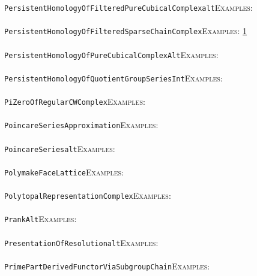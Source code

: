 \documentclass[a4paper,11pt]{report}
\begin{document}
{{ \texttt{PersistentHomologyOfFilteredPureCubicalComplex{\textunderscore}alt}{\nobreakspace}{\nobreakspace}{\nobreakspace}{\nobreakspace}\textsc{Examples:} \\
 \\
 \texttt{PersistentHomologyOfFilteredSparseChainComplex}{\nobreakspace}{\nobreakspace}{\nobreakspace}{\nobreakspace}\textsc{Examples:} \href{../www/SideLinks/About/aboutPersistent.html} {1}{\nobreakspace} \\
 \\
 \texttt{PersistentHomologyOfPureCubicalComplex{\textunderscore}Alt}{\nobreakspace}{\nobreakspace}{\nobreakspace}{\nobreakspace}\textsc{Examples:} \\
 \\
 \texttt{PersistentHomologyOfQuotientGroupSeries{\textunderscore}Int}{\nobreakspace}{\nobreakspace}{\nobreakspace}{\nobreakspace}\textsc{Examples:} \\
 \\
 \texttt{PiZeroOfRegularCWComplex}{\nobreakspace}{\nobreakspace}{\nobreakspace}{\nobreakspace}\textsc{Examples:} \\
 \\
 \texttt{PoincareSeriesApproximation}{\nobreakspace}{\nobreakspace}{\nobreakspace}{\nobreakspace}\textsc{Examples:} \\
 \\
 \texttt{PoincareSeries{\textunderscore}alt}{\nobreakspace}{\nobreakspace}{\nobreakspace}{\nobreakspace}\textsc{Examples:} \\
 \\
 \texttt{PolymakeFaceLattice}{\nobreakspace}{\nobreakspace}{\nobreakspace}{\nobreakspace}\textsc{Examples:} \\
 \\
 \texttt{PolytopalRepresentationComplex}{\nobreakspace}{\nobreakspace}{\nobreakspace}{\nobreakspace}\textsc{Examples:} \\
 \\
 \texttt{PrankAlt}{\nobreakspace}{\nobreakspace}{\nobreakspace}{\nobreakspace}\textsc{Examples:} \\
 \\
 \texttt{PresentationOfResolution{\textunderscore}alt}{\nobreakspace}{\nobreakspace}{\nobreakspace}{\nobreakspace}\textsc{Examples:} \\
 \\
 \texttt{PrimePartDerivedFunctorViaSubgroupChain}{\nobreakspace}{\nobreakspace}{\nobreakspace}{\nobreakspace}\textsc{Examples:} \\
 \\
}}
\end{document}
